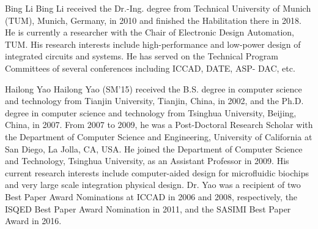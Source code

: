 \begin{IEEEbiography}
{Bing Li} 
Bing Li received the Dr.-Ing. degree from Technical University of Munich
(TUM), Munich, Germany, in 2010 and finished the Habilitation there in 2018.
He is currently a researcher with the Chair of Electronic Design Automation,
TUM. His research interests include high-performance and low-power
design of integrated circuits and systems. He has served on the Technical
Program Committees of several conferences including ICCAD, DATE, ASP-
DAC, etc.
\end{IEEEbiography}

\vskip -27.7pt
\begin{IEEEbiography}
{Hailong Yao} 
Hailong Yao (SM’15) received the B.S. degree in computer science and technology from Tianjin University, Tianjin, China, in 2002, and the Ph.D. degree in computer science and technology from Tsinghua University, Beijing, China, in 2007.
From 2007 to 2009, he was a Post-Doctoral Research Scholar with the Department of Computer Science and Engineering, University of California at San Diego, La Jolla, CA, USA. He joined the Department of Computer Science and Technology, Tsinghua University, as an Assistant Professor in 2009. His current research interests include computer-aided design for microfluidic biochips and very large scale integration physical design.
Dr. Yao was a recipient of two Best Paper Award Nominations at ICCAD in 2006 and 2008, respectively, the ISQED Best Paper Award Nomination in 2011, and the SASIMI Best Paper Award in 2016.
\end{IEEEbiography}

